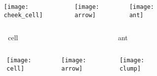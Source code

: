 \begin{figure}
\begin{columns}
\begin{column}{0.05\textwidth}
\begin{subfigure}[b]{\textwidth}
\caption{}
\label{fig:natural}
\end{subfigure}
\end{column}
\begin{column}{0.27\textwidth}
\texttt{[image: cheek\_cell]}
\end{column}
\begin{column}{0.07\textwidth}
\texttt{[image: arrow]}
\end{column}
\begin{column}{0.27\textwidth}
\texttt{[image: ant]}
\end{column}
\end{columns}
\vspace{1ex}
\begin{columns}
\begin{column}{0.05\textwidth}
\end{column}
\begin{column}{0.27\textwidth}
\centering
cell {\tiny\cite{clare_and_ben_2017}}
\end{column}
\begin{column}{0.07\textwidth}
\end{column}
\begin{column}{0.27\textwidth}
\centering
ant {\tiny\cite{quinzani_2008}}
\end{column}
\end{columns}
\vspace{2ex}
\begin{columns}
\begin{column}{0.05\textwidth}
\begin{subfigure}[b]{\textwidth}
\caption{}
\label{fig:simulated}
\end{subfigure}
\end{column}
\begin{column}{0.27\textwidth}
\texttt{[image: cell]}
\end{column}
\begin{column}{0.07\textwidth}
{\Large\texttt{[image: arrow]}}
\end{column}
\begin{column}{0.27\textwidth}
\texttt{[image: clump]}
\end{column}

\end{columns}
\end{figure}
